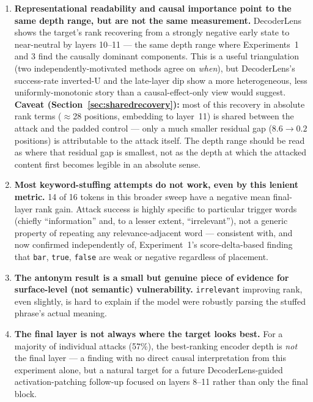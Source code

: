\documentclass[11pt]{article}
\begin{document}
\begin{enumerate}
  \item \textbf{Representational readability and causal importance point to
  the same depth range, but are not the same measurement.} DecoderLens
  shows the target's rank recovering from a strongly negative early state
  to near-neutral by layers 10--11 — the same depth range where
  Experiments~1 and 3 find the causally dominant components. This is a
  useful triangulation (two independently-motivated methods agree on
  \emph{when}), but DecoderLens's success-rate inverted-U and the
  late-layer dip show a more heterogeneous, less uniformly-monotonic story
  than a causal-effect-only view would suggest. \textbf{Caveat
  (Section~\ref{sec:sharedrecovery}):} most of this recovery in absolute
  rank terms ($\approx$28 positions, embedding to layer~11) is shared
  between the attack and the padded control — only a much smaller residual
  gap ($8.6\to0.2$ positions) is attributable to the attack itself. The
  depth range should be read as where that residual gap is smallest, not
  as the depth at which the attacked content first becomes legible in an
  absolute sense.
  \item \textbf{Most keyword-stuffing attempts do not work, even by this
  lenient metric.} 14 of 16 tokens in this broader sweep have a negative
  mean final-layer rank gain. Attack success is highly specific to
  particular trigger words (chiefly ``information'' and, to a lesser
  extent, ``irrelevant''), not a generic property of repeating any
  relevance-adjacent word — consistent with, and now confirmed
  independently of, Experiment~1's score-delta-based finding that
  \texttt{bar}, \texttt{true}, \texttt{false} are weak or negative
  regardless of placement.
  \item \textbf{The antonym result is a small but genuine piece of evidence
  for surface-level (not semantic) vulnerability.} \texttt{irrelevant}
  improving rank, even slightly, is hard to explain if the model were
  robustly parsing the stuffed phrase's actual meaning.
  \item \textbf{The final layer is not always where the target looks best.}
  For a majority of individual attacks (57\%), the best-ranking encoder
  depth is \emph{not} the final layer — a finding with no direct causal
  interpretation from this experiment alone, but a natural target for a
  future DecoderLens-guided activation-patching follow-up focused on
  layers 8--11 rather than only the final block.
\end{enumerate}
\end{document}
